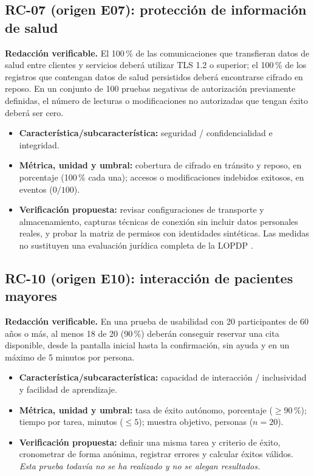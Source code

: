 \documentclass[11pt,a4paper]{article}
\begin{document}
\subsection*{RC-07 (origen E07): protección de información de salud}
\textbf{Redacción verificable.} El 100\,\% de las comunicaciones que transfieran datos de salud entre clientes y servicios deberá utilizar TLS 1.2 o superior; el 100\,\% de los registros que contengan datos de salud persistidos deberá encontrarse cifrado en reposo. En un conjunto de 100 pruebas negativas de autorización previamente definidas, el número de lecturas o modificaciones no autorizadas que tengan éxito deberá ser cero.
\begin{itemize}
\item \textbf{Característica/subcaracterística:} seguridad / confidencialidad e integridad.
\item \textbf{Métrica, unidad y umbral:} cobertura de cifrado en tránsito y reposo, en porcentaje (100\,\% cada una); accesos o modificaciones indebidos exitosos, en eventos (\(0/100\)).
\item \textbf{Verificación propuesta:} revisar configuraciones de transporte y almacenamiento, capturas técnicas de conexión sin incluir datos personales reales, y probar la matriz de permisos con identidades sintéticas. Las medidas no sustituyen una evaluación jurídica completa de la LOPDP \cite{lopdp2021}.
\end{itemize}

\subsection*{RC-10 (origen E10): interacción de pacientes mayores}
\textbf{Redacción verificable.} En una prueba de usabilidad con 20 participantes de 60 años o más, al menos 18 de 20 (90\,\%) deberán conseguir reservar una cita disponible, desde la pantalla inicial hasta la confirmación, sin ayuda y en un máximo de 5 minutos por persona.
\begin{itemize}
\item \textbf{Característica/subcaracterística:} capacidad de interacción / inclusividad y facilidad de aprendizaje.
\item \textbf{Métrica, unidad y umbral:} tasa de éxito autónomo, porcentaje (\(\geq90\)\,\%); tiempo por tarea, minutos (\(\leq5\)); muestra objetivo, personas (\(n=20\)).
\item \textbf{Verificación propuesta:} definir una misma tarea y criterio de éxito, cronometrar de forma anónima, registrar errores y calcular éxitos válidos. \emph{Esta prueba todavía no se ha realizado y no se alegan resultados.}
\end{itemize}
\end{document}
